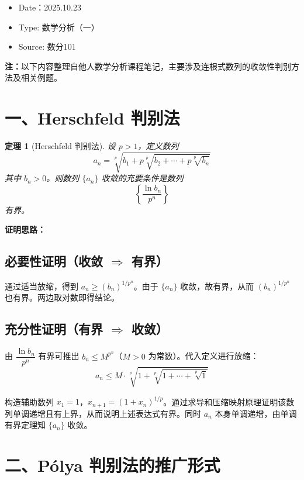 \documentclass{ctexart}
\newtheorem{theorem}{定理}
\begin{document}
	
	\begin{mdframed}
		\fangsong
	\begin{itemize}
		\item Date：2025.10.23
		\item Type: 数学分析（一）
		\item Source: 数分101
	\end{itemize}
	
	\end{mdframed}
	
	\textbf{注：}{\kaishu 以下内容整理自他人数学分析课程笔记，主要涉及连根式数列的收敛性判别方法及相关例题。}
	
	\section*{一、Herschfeld 判别法}
	
	\begin{theorem}[Herschfeld 判别法]
		设 $ p > 1 $，定义数列 
		$$ a_n = \sqrt[p]{b_1 + p\sqrt[p]{b_2 + \cdots + p\sqrt[p]{b_n}}} $$
		其中 $ b_n > 0 $。则数列 $ \{a_n\} $ 收敛的充要条件是数列 
		$$ \left\{ \frac{\ln b_n}{p^n} \right\} $$
		有界。
	\end{theorem}
	
	\textbf{证明思路：}
	
	\subsection*{必要性证明（收敛 $\Rightarrow$ 有界）}
	通过适当放缩，得到 $ a_n \ge (b_n)^{1/p^n} $。由于 $ \{a_n\} $ 收敛，故有界，从而 $ (b_n)^{1/p^n} $ 也有界。两边取对数即得结论。
	
	\subsection*{充分性证明（有界 $\Rightarrow$ 收敛）}
	由 $ \dfrac{\ln b_n}{p^n} $ 有界可推出 $ b_n \le M^{p^n} $（$ M > 0 $ 为常数）。代入定义进行放缩：
	$$ a_n \le M \cdot \sqrt[p]{1 + \sqrt[p]{1 + \cdots + \sqrt[p]{1}}} $$
	
	构造辅助数列 $ x_1 = 1 $，$ x_{n+1} = (1 + x_n)^{1/p} $。通过求导和压缩映射原理证明该数列单调递增且有上界，从而说明上述表达式有界。同时 $ a_n $ 本身单调递增，由单调有界定理知 $ \{a_n\} $ 收敛。
	
	\section*{二、Pólya 判别法的推广形式}
	
\end{document}
